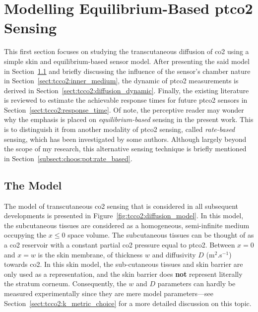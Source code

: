\section{Modelling Equilibrium-Based \texorpdfstring{\gls{ptco2}}{tcpCO2} Sensing}\label{sect:tcco2:modelling_tc_sensing}

This first section focuses on studying the transcutaneous diffusion of \gls{co2} using a simple skin and equilibrium-based sensor model. After presenting the said model in Section~\ref{sect:tcco2:model} and briefly discussing the influence of the sensor's chamber nature in Section~\ref{sect:tcco2:inner_medium}, the dynamic of \gls{ptco2} measurements is derived in Section~\ref{sect:tcco2:diffusion_dynamic}. Finally, the existing literature is reviewed to estimate the achievable response times for future \gls{ptco2} sensors in Section~\ref{sect:tcco2:response_time}. Of note, the perceptive reader may wonder why the emphasis is placed on \emph{equilibrium-based} sensing in the present work. This is to distinguish it from another modality of \gls{ptco2} sensing, called \emph{rate-based} sensing, which has been investigated by some authors. Although largely beyond the scope of my research, this alternative sensing technique is briefly mentioned in Section~\ref{subsect:choos:pot:rate_based}.

\subsection{The Model}\label{sect:tcco2:model}

The model of transcutaneous \gls{co2} sensing that is considered in all subsequent developments is presented in Figure~\ref{fig:tcco2:diffusion_model}. In this model, the subcutaneous tissues are considered as a homogeneous, semi-infinite medium occupying the $x\leq 0$ space volume. The subcutaneous tissues can be thought of as a \gls{co2} reservoir with a constant partial \gls{co2} pressure equal to \gls{ptco2}. Between $x=0$ and $x=w$ is the skin membrane, of thickness $w$ and diffusivity $D$ (m$^2$.s$^{-1}$) towards \gls{co2}. In this skin model, the sub-cutaneous tissues and skin barrier are only used as a representation, and the skin barrier does \textbf{not} represent literally the stratum corneum. Consequently, the $w$ and $D$ parameters can hardly be measured experimentally since they are mere model parameters---see Section~\ref{sect:tcco2:k_metric_choice} for a more detailed discussion on this topic.

